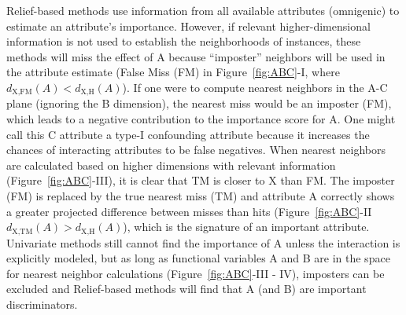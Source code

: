 \documentclass[10pt,letterpaper]{article}
\begin{document}

Relief-based methods use information from all available attributes (omnigenic) to estimate an attribute's importance. However, if relevant higher-dimensional information is not used to establish the neighborhoods of instances, these methods will miss the effect of A because ``imposter'' neighbors will be used in the attribute estimate (False Miss (FM) in Figure~\ref{fig:ABC}-I, where $d_{\text{X,FM}}(A)<d_{\text{X,H}}(A)$).  If one were to compute nearest neighbors in the A-C plane (ignoring the B dimension), the nearest miss would be an imposter (FM), which leads to a negative contribution to the importance score for A. One might call this C attribute a type-I confounding attribute because it increases the chances of interacting attributes to be false negatives. When nearest neighbors are calculated based on higher dimensions with relevant information (Figure~\ref{fig:ABC}-III), it is clear that TM is closer to X than FM. The imposter (FM) is replaced by the true nearest miss (TM) and attribute A correctly shows a greater projected difference between misses than hits (Figure~\ref{fig:ABC}-II $d_{\text{X,TM}}(A)>d_{\text{X,H}}(A)$), which is the signature of an important attribute. Univariate methods still cannot find the importance of A unless the interaction is explicitly modeled, but as long as functional variables A and B are in the space for nearest neighbor calculations (Figure~\ref{fig:ABC}-III - IV), imposters can be excluded and Relief-based methods will find that A (and B) are important discriminators. 
\end{document}
